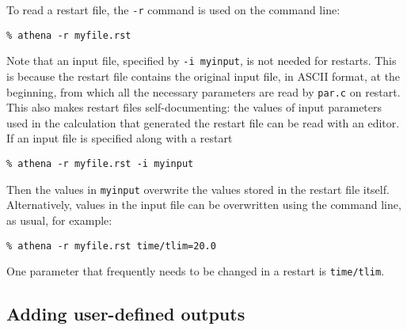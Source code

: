 To read a restart file, the {\tt -r} command is used on the command line:
\begin{verbatim}
% athena -r myfile.rst
\end{verbatim}
Note that an input file, specified by {\tt -i myinput}, is not needed for
restarts.  This is because the restart file contains the original input file,
in ASCII format, at the beginning, from which all the necessary parameters
are read by {\tt par.c} on restart.  This also makes restart files self-documenting: the values of input parameters used in the calculation that generated
the restart file can be read with an editor.  If an input file is specified
along with a restart
\begin{verbatim}
% athena -r myfile.rst -i myinput
\end{verbatim}
Then the values in {\tt myinput} overwrite the values stored in the restart file
itself.  Alternatively, values in the input file can be overwritten using the
command line, as usual, for example:
\begin{verbatim}
% athena -r myfile.rst time/tlim=20.0
\end{verbatim}
One parameter that frequently needs to be changed in a restart is 
{\tt time/tlim}.

\subsection{Adding user-defined outputs}

